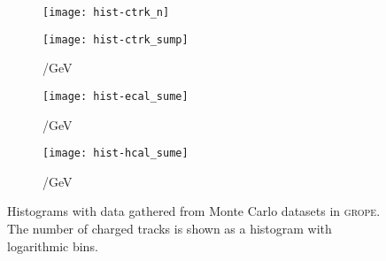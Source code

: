 \begin{figure}
    \centering
    \begin{subfigure}[c]{0.49\linewidth}
        \centering
        \texttt{[image: hist-ctrk\_n]}
        \caption{%
            \ncharged
        }
        \label{fig:hist/ncharged}
    \end{subfigure}
    \hfill
    \begin{subfigure}[c]{0.49\linewidth}
        \centering
        \texttt{[image: hist-ctrk\_sump]}
        \caption{%
            \pcharged/\si{\giga\electronvolt}
        }
        \label{fig:hist/pcharged}
    \end{subfigure}

    \vspace{2ex}

    \begin{subfigure}[c]{0.49\linewidth}
        \centering
        \texttt{[image: hist-ecal\_sume]}
        \caption{%
            \eecal/\si{\giga\electronvolt}
        }
        \label{fig:hist/eecal}
    \end{subfigure}
    \hfill
    \begin{subfigure}[c]{0.49\linewidth}
        \centering
        \texttt{[image: hist-hcal\_sume]}
        \caption{%
            \ehcal/\si{\giga\electronvolt}
        }
        \label{fig:hist/ehcal}
    \end{subfigure}
    \caption{%
        Histograms with data gathered from Monte Carlo datasets in
        \textsc{grope}. The number of charged tracks is shown as a histogram
        with logarithmic bins.
    }
    \label{fig:hist}
\end{figure}
